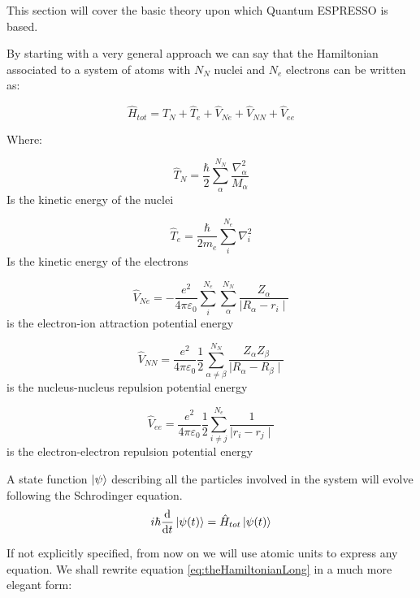 \documentclass[a4paper,12pt]{article}
\begin{document}
This section will cover the basic theory upon which Quantum ESPRESSO is based.

By starting with a very general approach we can say that the Hamiltonian associated to a system of atoms with $N_N$ nuclei and $N_e$ electrons can be written as:


\begin{equation}\label{eq:theHamiltonianLong}
\hat{H}_{tot} = \hat{T}_{N} + \hat{T}_{e} + \hat{V}_{Ne} + \hat{V}_{NN} + \hat{V}_{ee}
\end{equation}

Where:

\begin{equation}
\hat{T}_{N} = \frac{\hbar}{2} \sum_{\alpha}^{N_N} \frac{\nabla_{\alpha}^2}{M_{\alpha}}
\end{equation}
Is the kinetic energy of the nuclei

\begin{equation}
\hat{T}_{e} = \frac{\hbar}{2m_{e}} \sum_{i}^{N_e} \nabla_{i}^2
\end{equation}
Is the kinetic energy of the electrons

\begin{equation}
\hat{V}_{Ne} = -\frac{e^2}{4\pi\varepsilon_{0}} \sum_{i}^{N_e}\sum_{\alpha}^{N_N} \frac{Z_{\alpha}}{\mid R_{\alpha} - r_{i} \mid }
\end{equation}
is the electron-ion attraction potential energy

\begin{equation}
\hat{V}_{NN} = \frac{e^2}{4\pi\varepsilon_{0}} \frac{1}{2} \sum_{\alpha \neq \beta}^{N_N} \frac{Z_{\alpha} Z_{\beta}}{\mid R_{\alpha} - R_{\beta} \mid }
\end{equation}
is the nucleus-nucleus repulsion potential energy

\begin{equation}
\hat{V}_{ee} = \frac{e^2}{4\pi\varepsilon_{0}} \frac{1}{2} \sum_{i \neq j}^{N_e} \frac{1}{\mid r_{i} - r_{j} \mid }
\end{equation}
is the electron-electron repulsion potential energy

A state function $\ket{\psi}$ describing all the particles involved in the system will evolve following the Schrodinger equation.
\begin{equation}\label{eq:eq_sch}
	i\hbar\dv{t}\ket{\psi(t)} = \hat{H}_{tot}\ket{\psi(t)}
\end{equation}

If not explicitly specified, from now on we will use atomic units \cite[p.42]{Attila} to express any equation.
We shall rewrite equation \eqref{eq:theHamiltonianLong} in a much more elegant form:
\end{document}
